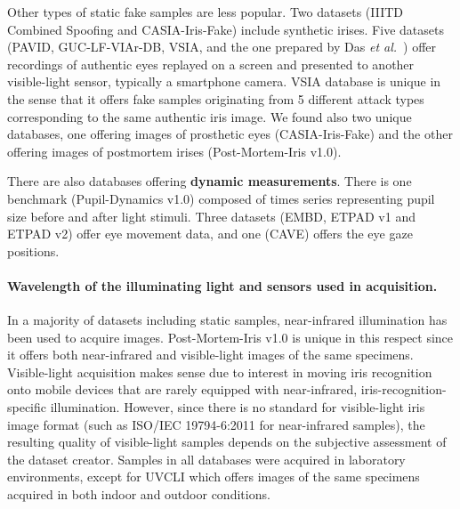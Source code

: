 \documentclass[format=acmsmall, review=false, timestamp=false]{acmart}
\newcommand{\etal}{{\it et al.}~}
\begin{document}
Other types of static {fake} samples are less popular. Two datasets ({\sf IIITD Combined Spoofing} and {\sf CASIA-Iris-Fake}) include synthetic irises. Five datasets ({\sf PAVID}, {\sf GUC-LF-VIAr-DB}, {\sf VSIA}, and the one prepared by Das \etal \cite{Das_PRL_2016}) offer recordings of authentic eyes replayed on a screen and presented to another visible-light sensor, typically a smartphone camera. {{\sf VSIA} database is unique in the sense that it offers fake samples originating from 5 different attack types corresponding to the same authentic iris image.} {We found also two unique databases, one offering images of prosthetic eyes ({\sf CASIA-Iris-Fake}) and the other offering images of postmortem irises ({\sf Post-Mortem-Iris v1.0}).}

There are also databases offering {\bf dynamic measurements}. There is one benchmark ({\sf Pupil-Dynamics v1.0}) composed of times series representing pupil size before and after light stimuli. Three datasets ({\sf EMBD}, {\sf ETPAD v1} and {\sf ETPAD v2}) offer eye movement data, and one ({\sf CAVE}) offers the eye gaze positions.

\paragraph{Wavelength of the illuminating light and sensors used in acquisition.} In a majority of datasets including static samples{,} near-infrared illumination has been used to acquire images. {\sf Post-Mortem-Iris v1.0} is unique in this respect since it offers both near-infrared and visible-light images of the same specimens. Visible-light acquisition makes sense due to interest in moving iris recognition onto mobile devices that are rarely equipped with near-infrared, iris-recognition-specific illumination. However, since there is no standard for visible-light iris image format (such as ISO/IEC 19794-6:2011 for near-infrared samples), the resulting quality of visible-light samples depends on the subjective assessment of the dataset creator. Samples in all databases were acquired in laboratory environment{s}, except for {\sf UVCLI} which offers images of the same specimens acquired in both indoor and outdoor conditions.
\end{document}
